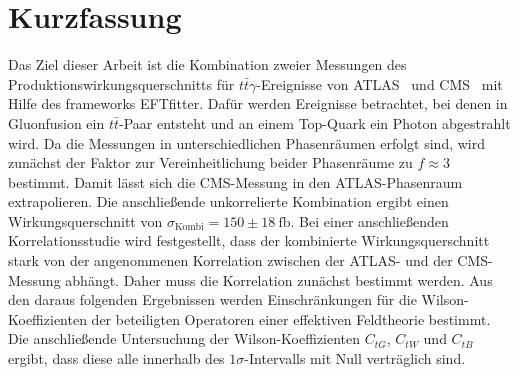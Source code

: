 \thispagestyle{plain}
\section*{Kurzfassung}
Das Ziel dieser Arbeit ist die Kombination zweier Messungen des Produktionswirkungsquerschnitts für $t\bar{t}\gamma$-Ereignisse von ATLAS~\cite{Aaboud:2017era} und CMS~\cite{Sirunyan:2017iyh} mit Hilfe des frameworks EFTfitter\cite{Castro:2016jjv}. Dafür werden Ereignisse betrachtet, bei denen in Gluonfusion ein $t\bar{t}$-Paar entsteht und an einem Top-Quark ein Photon abgestrahlt wird.
Da die Messungen in unterschiedlichen Phasenräumen erfolgt sind, wird zunächst der Faktor zur Vereinheitlichung beider Phasenräume zu $f\approx 3$ bestimmt. Damit lässt sich die CMS-Messung in den ATLAS-Phasenraum extrapolieren. Die anschließende unkorrelierte Kombination ergibt einen Wirkungsquerschnitt von $\sigma_{\text{Kombi}} = 150 \pm 18~ \si{\femto\barn}$. Bei einer anschließenden Korrelationsstudie wird festgestellt, dass der kombinierte Wirkungsquerschnitt stark von der angenommenen Korrelation zwischen der ATLAS- und der CMS-Messung abhängt. Daher muss die Korrelation zunächst bestimmt werden. Aus den daraus folgenden Ergebnissen werden Einschränkungen für die
Wilson-Koeffizienten der beteiligten Operatoren einer effektiven Feldtheorie bestimmt. Die anschließende Untersuchung der Wilson-Koeffizienten $C_{tG}$, $C_{tW}$ und $C_{tB}$ ergibt, dass diese alle innerhalb des $1\sigma$-Intervalls mit Null verträglich sind.

